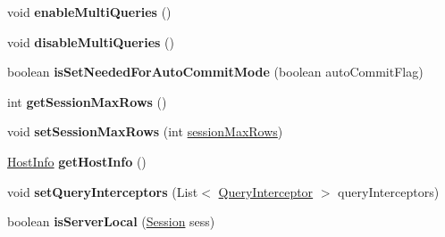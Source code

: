 \begin{DoxyCompactItemize}
\mbox{\label{classcom_1_1mysql_1_1cj_1_1_native_session_aa9168ab8630c8828f5b8d768e6cb7bcd}} 
void {\bfseries enable\+Multi\+Queries} ()
\item 
\mbox{\label{classcom_1_1mysql_1_1cj_1_1_native_session_ac5212fd0dd51d49b2a947110ea47d633}} 
void {\bfseries disable\+Multi\+Queries} ()
\item 
\mbox{\label{classcom_1_1mysql_1_1cj_1_1_native_session_a6c17459969e6753f0b81ebe4ad6dfeea}} 
boolean {\bfseries is\+Set\+Needed\+For\+Auto\+Commit\+Mode} (boolean auto\+Commit\+Flag)
\item 
\mbox{\label{classcom_1_1mysql_1_1cj_1_1_native_session_acfb2e9bb55f978d62b41814adbaf940d}} 
int {\bfseries get\+Session\+Max\+Rows} ()
\item 
\mbox{\label{classcom_1_1mysql_1_1cj_1_1_native_session_a2a00f7d68bbd14f1e9b1ab4509cef54b}} 
void {\bfseries set\+Session\+Max\+Rows} (int \mbox{\hyperlink{classcom_1_1mysql_1_1cj_1_1_core_session_a6206b6d3a13ba61a394fd6ab6e93eafc}{session\+Max\+Rows}})
\item 
\mbox{\label{classcom_1_1mysql_1_1cj_1_1_native_session_a9a6129d65239775a738e640addb8d9db}} 
\mbox{\hyperlink{classcom_1_1mysql_1_1cj_1_1conf_1_1_host_info}{Host\+Info}} {\bfseries get\+Host\+Info} ()
\item 
\mbox{\label{classcom_1_1mysql_1_1cj_1_1_native_session_acf6953e6fd07ccbc194907d725e84624}} 
void {\bfseries set\+Query\+Interceptors} (List$<$ \mbox{\hyperlink{interfacecom_1_1mysql_1_1cj_1_1interceptors_1_1_query_interceptor}{Query\+Interceptor}} $>$ query\+Interceptors)
\item 
\mbox{\label{classcom_1_1mysql_1_1cj_1_1_native_session_a9364f1208646a5b6fb3ceda2cef15822}} 
boolean {\bfseries is\+Server\+Local} (\mbox{\hyperlink{interfacecom_1_1mysql_1_1cj_1_1_session}{Session}} sess)
\item 

\end{DoxyCompactItemize}
